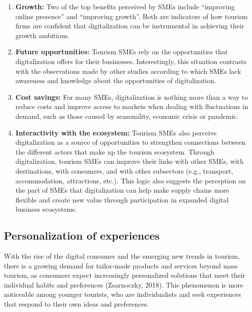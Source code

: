 \documentclass[
  letterpaper,
  DIV=11,
  numbers=noendperiod]{scrreprt}
\begin{document}
\begin{enumerate}
\def\labelenumi{\arabic{enumi}.}
\item
  \textbf{Growth:} Two of the top benefits perceived by SMEs include
  ``improving online presence'' and ``improving growth''. Both are
  indicators of how tourism firms are confident that digitalization can
  be instrumental in achieving their growth ambitions.
\item
  \textbf{Future opportunities:} Tourism SMEs rely on the opportunities
  that digitalization offers for their businesses. Interestingly, this
  situation contrasts with the observations made by other studies
  according to which SMEs lack awareness and knowledge about the
  opportunities of digitalization.
\item
  \textbf{Cost savings:} For many SMEs, digitalization is nothing more
  than a way to reduce costs and improve access to markets when dealing
  with fluctuations in demand, such as those caused by seasonality,
  economic crisis or pandemic.
\item
  \textbf{Interactivity with the ecosystem:} Tourism SMEs also perceive
  digitalization as a source of opportunities to strengthen connections
  between the different actors that make up the tourism ecosystem.
  Through digitalization, tourism SMEs can improve their links with
  other SMEs, with destinations, with consumers, and with other
  subsectors (e.g., transport, accommodation, attractions, etc.). This
  logic also suggests the perception on the part of SMEs that
  digitalization can help make supply chains more flexible and create
  new value through participation in expanded digital business
  ecosystems.
\end{enumerate}

\hypertarget{personalization-of-experiences}{%
\subsection{Personalization of
experiences}\label{personalization-of-experiences}}

With the rise of the digital consumer and the emerging new trends in
tourism, there is a growing demand for tailor-made products and services
beyond mass tourism, as consumers expect increasingly personalized
solutions that meet their individual habits and preferences (Zsarnoczky,
2018). This phenomenon is more noticeable among younger tourists, who
are individualists and seek experiences that respond to their own ideas
and preferences.
\end{document}
